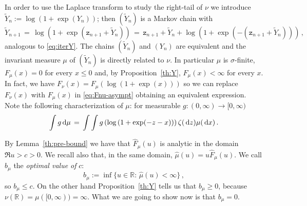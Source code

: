 \documentclass[reqno,11pt]{amsart}
\numberwithin{equation}{section}
\renewcommand{\tilde}{\widetilde}
\newcommand{\dd}{\,\text{\rm d}}             %
\newcommand{\bbR}{{\ensuremath{\mathbb R}} }
\newcommand{\gz}{\zeta}
\newcommand{\gs}{\sigma}
\newcommand{\logZ}{\mathtt{z}}
\begin{document}
In order to use the Laplace transform to study the right-tail of $\nu$ we introduce
$\tilde Y_n:= \log(1+ \exp(Y_n))$; then $(\tilde Y_n)$ is a Markov chain with
\begin{equation}
\label{eq:iterYtilde}
\tilde Y_{n+1}\, =\,  \log \left( 1+ \exp\left(  \logZ_{n+1} + \tilde Y_n\right)\right)\,=\,  \logZ_{n+1} + \tilde Y_n + \log \left( 1+ \exp\left( -\left( \logZ_{n+1} + \tilde Y_n\right)\right)\right)\, ,
\end{equation}
analogous to \eqref{eq:iterY}. 
The chains $(\tilde Y_n)$ and $(Y_n)$ are equivalent and the invariant measure $\mu$ of  $(\tilde Y_n)$ is directly related to $\nu$. In particular $\mu$ is $\gs$-finite,  $F_\mu(x)=0$ for every $x \le 0$ and,  
by Proposition~\ref{th:Y},  $F_\mu(x)< \infty$ for every $x$.  In fact, we have    
  $F_\nu(x)=F_\mu( \log(1+\exp(x)))$ so we can replace $F_\nu(x)$ with $F_\mu(x)$ in 
 \eqref{eq:Fnu-asympt} 
obtaining an equivalent expression.
Note the following characterization of $\mu$: for measurable $g: (0, \infty)\to [0, \infty)$
\begin{equation}
\label{eq:formu}
\int g \dd \mu \, =\, \int \int g\left( \log \left(1+ \exp(-z-x)\right) \right) \gz(\dd z) \mu(\dd x)\,.  
\end{equation}




By Lemma~\ref{th:pre-bound} we have that $\widehat F_\mu (u)$ is analytic in the domain $\Re u>c>0$.
We recall also that, in the same domain,  $\widehat \mu (u)=u\widehat F_\mu (u)$.
We call $b_\mu$ the \emph{optimal value of } $c$:
\begin{equation}
b_\mu:=\inf\{u\in \bbR :\,  \widehat \mu (u)< \infty\}\, ,
\end{equation}
so $b_\mu \le c$.
On the other hand Proposition~\ref{th:Y} tells us that $b_\mu \ge  0$, because $\nu(\bbR)=\mu([0, \infty))= \infty$. 
What we are going to show now is 
 that $b_\mu=0$.
 
\end{document}
